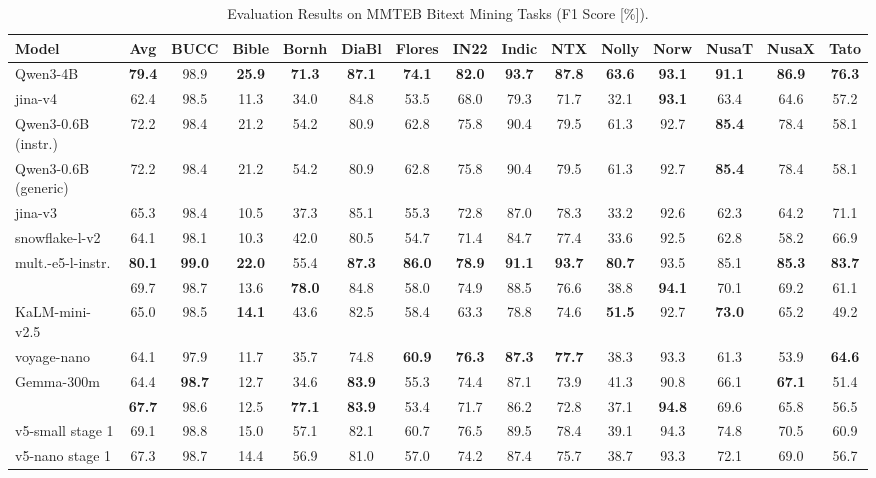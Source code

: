 \documentclass[11pt]{article}
\begin{document}
\begin{table}[H]
\caption{Evaluation Results on MMTEB Bitext Mining Tasks (F1 Score [\%]).}
\label{tab:bitext_mining}
\centering
\small
\setlength{\tabcolsep}{1.5pt}
\begin{tabular}{l*{14}{c}}
\toprule
\textbf{Model} & \textbf{Avg} & \textbf{BUCC} & \textbf{Bible} & \textbf{Bornh} & \textbf{DiaBl} & \textbf{Flores} & \textbf{IN22} & \textbf{Indic} & \textbf{NTX} & \textbf{Nolly} & \textbf{Norw} & \textbf{NusaT} & \textbf{NusaX} & \textbf{Tato} \\
\midrule
Qwen3-4B & \textbf{79.4} & 98.9 & \textbf{25.9} & \textbf{71.3} & \textbf{87.1} & \textbf{74.1} & \textbf{82.0} & \textbf{93.7} & \textbf{87.8} & \textbf{63.6} & \textbf{93.1} & \textbf{91.1} & \textbf{86.9} & \textbf{76.3} \\
jina-v4 & 62.4 & 98.5 & 11.3 & 34.0 & 84.8 & 53.5 & 68.0 & 79.3 & 71.7 & 32.1 & \textbf{93.1} & 63.4 & 64.6 & 57.2 \\
\midrule
Qwen3-0.6B (instr.) & 72.2 & 98.4 & 21.2 & 54.2 & 80.9 & 62.8 & 75.8 & 90.4 & 79.5 & 61.3 & 92.7 & \textbf{85.4} & 78.4 & 58.1 \\
Qwen3-0.6B (generic) & 72.2 & 98.4 & 21.2 & 54.2 & 80.9 & 62.8 & 75.8 & 90.4 & 79.5 & 61.3 & 92.7 & \textbf{85.4} & 78.4 & 58.1 \\
jina-v3 & 65.3 & 98.4 & 10.5 & 37.3 & 85.1 & 55.3 & 72.8 & 87.0 & 78.3 & 33.2 & 92.6 & 62.3 & 64.2 & 71.1 \\
snowflake-l-v2 & 64.1 & 98.1 & 10.3 & 42.0 & 80.5 & 54.7 & 71.4 & 84.7 & 77.4 & 33.6 & 92.5 & 62.8 & 58.2 & 66.9 \\
mult.-e5-l-instr. & \textbf{80.1} & \textbf{99.0} & \textbf{22.0} & 55.4 & \textbf{87.3} & \textbf{86.0} & \textbf{78.9} & \textbf{91.1} & \textbf{93.7} & \textbf{80.7} & 93.5 & 85.1 & \textbf{85.3} & \textbf{83.7} \\
\JEmbeddingVFiveTextSmallShort{} & 69.7 & 98.7 & 13.6 & \textbf{78.0} & 84.8 & 58.0 & 74.9 & 88.5 & 76.6 & 38.8 & \textbf{94.1} & 70.1 & 69.2 & 61.1 \\
\midrule
KaLM-mini-v2.5 & 65.0 & 98.5 & \textbf{14.1} & 43.6 & 82.5 & 58.4 & 63.3 & 78.8 & 74.6 & \textbf{51.5} & 92.7 & \textbf{73.0} & 65.2 & 49.2 \\
voyage-nano & 64.1 & 97.9 & 11.7 & 35.7 & 74.8 & \textbf{60.9} & \textbf{76.3} & \textbf{87.3} & \textbf{77.7} & 38.3 & 93.3 & 61.3 & 53.9 & \textbf{64.6} \\
Gemma-300m & 64.4 & \textbf{98.7} & 12.7 & 34.6 & \textbf{83.9} & 55.3 & 74.4 & 87.1 & 73.9 & 41.3 & 90.8 & 66.1 & \textbf{67.1} & 51.4 \\
\JEmbeddingVFiveTextNanoShort{} & \textbf{67.7} & 98.6 & 12.5 & \textbf{77.1} & \textbf{83.9} & 53.4 & 71.7 & 86.2 & 72.8 & 37.1 & \textbf{94.8} & 69.6 & 65.8 & 56.5 \\
\midrule
v5-small stage 1 & 69.1 & 98.8 & 15.0 & 57.1 & 82.1 & 60.7 & 76.5 & 89.5 & 78.4 & 39.1 & 94.3 & 74.8 & 70.5 & 60.9 \\
v5-nano stage 1 & 67.3 & 98.7 & 14.4 & 56.9 & 81.0 & 57.0 & 74.2 & 87.4 & 75.7 & 38.7 & 93.3 & 72.1 & 69.0 & 56.7 \\
\bottomrule
\end{tabular}


\end{table}
\end{document}
